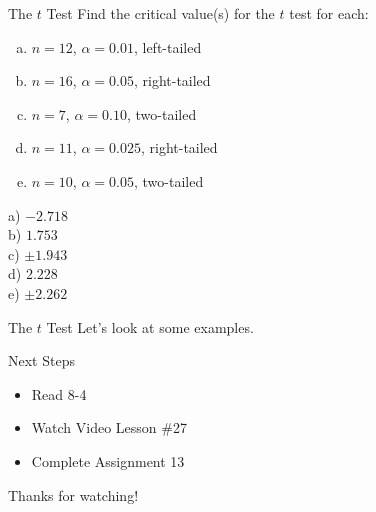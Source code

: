 \documentclass[t, aspectratio=169]{beamer}
\newcommand{\?}{\stackrel{?}{=}}
\begin{document}
	\begin{frame}{The $t$ Test}
		Find the critical value(s) for the $t$ test for each: \begin{enumerate}[a)]
			\item $n = 12$, $\alpha = 0.01$, left-tailed
			\item $n = 16$, $\alpha = 0.05$, right-tailed
			\item $n = 7$, $\alpha = 0.10$, two-tailed
			\item $n = 11$, $\alpha = 0.025$, right-tailed
			\item $n = 10$, $\alpha = 0.05$, two-tailed
		\end{enumerate} \pause
	
		a) $-2.718$ \pause \\
		b) $1.753$ \pause \\
		c) $\pm 1.943$ \pause \\
		d) $2.228$ \pause \\
		e) $\pm 2.262$
	\end{frame}

	\begin{frame}{The $t$ Test}
		Let's look at some examples.
	\end{frame}

	\begin{frame}{Next Steps}
		\begin{itemize}
			\item Read 8-4
			\item Watch Video Lesson \#27
			\item Complete Assignment 13
		\end{itemize}
	
		\vfill
		
		Thanks for watching!
	\end{frame}
	
\end{document}
